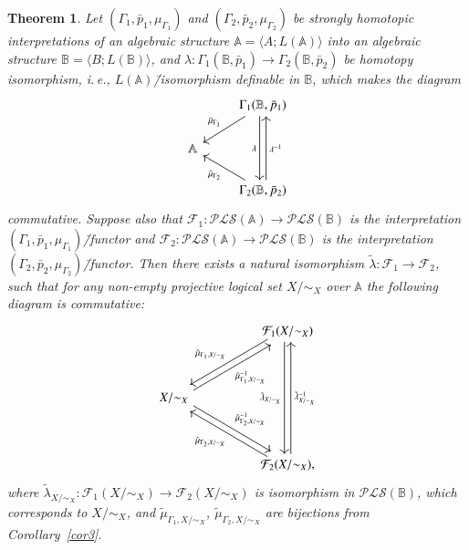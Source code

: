 \documentclass[12pt]{article}
\newtheorem{theorem}{Theorem}
\theoremstyle{definition}
\def\MA{{\mathbb{A}}}
\def\MB{{\mathbb{B}}}
\def\F{{\mathcal{F}}}
\def\PLS{{\mathcal{PLS}}}
\begin{document}
\begin{theorem}\label{th:homotopy}
Let $(\Gamma_1,\bar p_1,\mu_{\Gamma_1})$ and $(\Gamma_2,\bar p_2,\mu_{\Gamma_2})$ be strongly homotopic interpretations of an algebraic structure $\MA=\langle A; L(\MA)\rangle$ into an algebraic structure $\MB=\langle B; L(\MB)\rangle$, and $\lambda\colon\Gamma_1(\MB,\bar p_1)\to\Gamma_2(\MB,\bar p_2)$ be homotopy isomorphism, i.\,e., $L(\MA)$\=/isomorphism definable in $\MB$, which makes the diagram 
\begin{equation}\label{eq:homotopic}
\begin{tikzcd}
& \Gamma_1(\MB,\bar p_1) \ar[dl, "\bar{\mu}_{\Gamma_1}"'] 
\ar[dd, shift right, "\lambda"']\\
\MA  & \\
& \Gamma_2(\MB,\bar p_2) 
\ar[ul, "\bar{\mu}_{\Gamma_2}"] 
\ar[uu, shift right, "\lambda^{-1}"']
\end{tikzcd} 
\end{equation} 
commutative. Suppose also that $\F_1\colon \PLS(\MA)\to\PLS(\MB)$ is the interpretation $(\Gamma_1,\bar p_1,\mu_{\Gamma_1})$\=/functor and $\F_2\colon \PLS(\MA)\to\PLS(\MB)$ is the interpretation $(\Gamma_2,\bar p_2,\mu_{\Gamma_2})$\=/functor. Then there exists a natural isomorphism $\tilde\lambda\colon\F_1\to\F_2$, such that for any non-empty projective logical set $X/{\sim_X}$ over $\MA$ the following diagram is commutative:
\begin{equation}\label{eq:homotopic2}
\begin{tikzcd}[column sep=huge, row sep=huge]
& \F_1(X/{\sim_X})
\ar[dl, shift right, "\tilde{\mu}_{\Gamma_1,X/{\sim_X}}"'] 
\ar[dd, shift right, "\tilde\lambda_{X/{\sim_X}}"']\\
X/{\sim_X} 
\ar[ur, shift right, "\tilde{\mu}^{-1}_{\Gamma_1,X/{\sim_X}}"'] 
\ar[dr, shift left, "\tilde{\mu}^{-1}_{\Gamma_2,X/{\sim_X}}"] 
& \\
& \F_2(X/{\sim_X}) 
\ar[ul, shift left, "\tilde{\mu}_{\Gamma_2, X/{\sim_X}}"] 
\ar[uu, shift right, "\tilde\lambda^{-1}_{X/{\sim_X}}"'],
\end{tikzcd} 
\end{equation}
where $\tilde\lambda_{X/{\sim_X}}\colon \F_1(X/{\sim_X})\to\F_2(X/{\sim_X})$ is isomorphism in $\PLS(\MB)$, which corresponds to $X/{\sim_X}$, and $\tilde\mu_{\Gamma_1,X/{\sim_X}}$, $\tilde\mu_{\Gamma_2,X/{\sim_X}}$ are bijections from Corollary~\ref{cor3}.
\end{theorem}
\end{document}
